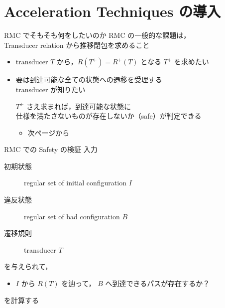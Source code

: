 \documentclass[presentation, xetex]{beamer}
\begin{document}
\section{Acceleration Techniques の導入}
\label{sec:org33ed2b7}

\begin{frame}[label={sec:orgec24d78}]{RMC でそもそも何をしたいのか}
RMC の一般的な課題は，\\
Transducer relation から推移閉包を求めること
\begin{itemize}
\item transducer \(T\) から，\(R(T^+) = R^+(T)\) となる \(T^+\) を求めたい
\item 要は到達可能な全ての状態への遷移を受理する \\
transducer が知りたい

\(T^+\) さえ求まれば，到達可能な状態に \\
仕様を満たさないものが存在しないか（safe）が判定できる
\begin{itemize}
\item 次ページから
\end{itemize}
\end{itemize}
\end{frame}


\begin{frame}[label={sec:org0935d91}]{RMC での Safety の検証}
入力
\begin{description}
\item[{初期状態}] regular set of initial configuration \(I\)
\item[{違反状態}] regular set of bad configuration \(B\)
\item[{遷移規則}] transducer \(T\)
\end{description}

を与えられて，
\begin{itemize}
\item \(I\) から \(R(T)\) を辿って，
\(B\) へ到達できるパスが存在するか？
\end{itemize}
を計算する
\end{frame}
\end{document}

